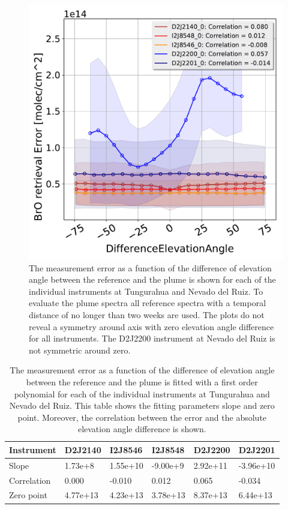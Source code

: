 \begin{figure}
	\centering
	\includegraphics[width=0.7\linewidth]{Bilder/DiffElevAngleallInstruments}
	\caption{The  measurement error as a function of the difference of elevation angle between the reference and the plume is shown for each of the individual instruments at Tungurahua and Nevado del Ruiz. To evaluate the plume spectra all reference spectra with a temporal distance of no longer than two weeks are used. The plots do not reveal a symmetry around axis with zero elevation angle difference for all instruments. The D2J2200 instrument at Nevado del Ruiz is not symmetric around zero.}
	\label{fig:diffeleangle}
\end{figure}
\begin{table}[h]
	\centering
	\begin{tabular}{|p{2cm}|p{2cm}|p{2cm}|p{2cm}|p{2cm}|p{2cm}|}
		Instrument	&D2J2140&I2J8546& I2J8548&D2J2200&D2J2201\\
		\toprule
		Slope& 1.73e+8& 1.55e+10  &-9.00e+9 &2.92e+11&-3.96e+10\\
		\midrule
		Correlation&
		0.000&
		-0.010&
		0.012&
		0.065&
		-0.034\\
		\midrule
		Zero point&4.77e+13&4.23e+13&3.78e+13&8.37e+13 &6.44e+13 \\
		\bottomrule
	\end{tabular}
	\caption{The  measurement error as a function of the difference of elevation angle between the reference and the plume is fitted with a first order polynomial for each of the individual instruments at Tungurahua and Nevado del Ruiz. This table shows the fitting parameters slope and zero point. Moreover, the correlation between the  error and the absolute elevation angle difference is shown. }
\end{table}
